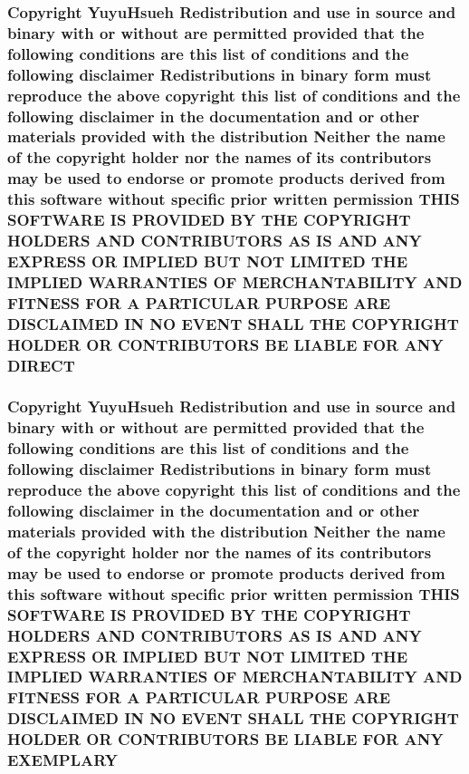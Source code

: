 \subsubsection[{\texorpdfstring{D\+I\+R\+E\+CT}{DIRECT}}]{\setlength{\rightskip}{0pt plus 5cm}Copyright Yuyu\+Hsueh Redistribution and use in source and binary with or without are permitted provided that the following conditions are this list of conditions and the following disclaimer Redistributions in binary form must reproduce the above copyright this list of conditions and the following disclaimer in the documentation and or other materials provided with the distribution Neither the name of the copyright holder nor the names of its contributors may be used to endorse or promote products derived from this software without specific prior written permission T\+H\+IS S\+O\+F\+T\+W\+A\+RE IS P\+R\+O\+V\+I\+D\+ED BY T\+HE C\+O\+P\+Y\+R\+I\+G\+HT H\+O\+L\+D\+E\+RS A\+ND C\+O\+N\+T\+R\+I\+B\+U\+T\+O\+RS AS IS A\+ND A\+NY E\+X\+P\+R\+E\+SS OR I\+M\+P\+L\+I\+ED B\+UT N\+OT L\+I\+M\+I\+T\+ED T\+HE I\+M\+P\+L\+I\+ED {\bf W\+A\+R\+R\+A\+N\+T\+I\+ES} OF M\+E\+R\+C\+H\+A\+N\+T\+A\+B\+I\+L\+I\+TY A\+ND F\+I\+T\+N\+E\+SS F\+OR A P\+A\+R\+T\+I\+C\+U\+L\+AR P\+U\+R\+P\+O\+SE A\+RE D\+I\+S\+C\+L\+A\+I\+M\+ED IN NO E\+V\+E\+NT S\+H\+A\+LL T\+HE C\+O\+P\+Y\+R\+I\+G\+HT H\+O\+L\+D\+ER OR C\+O\+N\+T\+R\+I\+B\+U\+T\+O\+RS BE L\+I\+A\+B\+LE F\+OR A\+NY D\+I\+R\+E\+CT}\hypertarget{license_8txt_a9ecfdaf89f3cf85421feb43ef16f372d}{}\label{license_8txt_a9ecfdaf89f3cf85421feb43ef16f372d}
\subsubsection[{\texorpdfstring{E\+X\+E\+M\+P\+L\+A\+RY}{EXEMPLARY}}]{\setlength{\rightskip}{0pt plus 5cm}Copyright Yuyu\+Hsueh Redistribution and use in source and binary with or without are permitted provided that the following conditions are this list of conditions and the following disclaimer Redistributions in binary form must reproduce the above copyright this list of conditions and the following disclaimer in the documentation and or other materials provided with the distribution Neither the name of the copyright holder nor the names of its contributors may be used to endorse or promote products derived from this software without specific prior written permission T\+H\+IS S\+O\+F\+T\+W\+A\+RE IS P\+R\+O\+V\+I\+D\+ED BY T\+HE C\+O\+P\+Y\+R\+I\+G\+HT H\+O\+L\+D\+E\+RS A\+ND C\+O\+N\+T\+R\+I\+B\+U\+T\+O\+RS AS IS A\+ND A\+NY E\+X\+P\+R\+E\+SS OR I\+M\+P\+L\+I\+ED B\+UT N\+OT L\+I\+M\+I\+T\+ED T\+HE I\+M\+P\+L\+I\+ED {\bf W\+A\+R\+R\+A\+N\+T\+I\+ES} OF M\+E\+R\+C\+H\+A\+N\+T\+A\+B\+I\+L\+I\+TY A\+ND F\+I\+T\+N\+E\+SS F\+OR A P\+A\+R\+T\+I\+C\+U\+L\+AR P\+U\+R\+P\+O\+SE A\+RE D\+I\+S\+C\+L\+A\+I\+M\+ED IN NO E\+V\+E\+NT S\+H\+A\+LL T\+HE C\+O\+P\+Y\+R\+I\+G\+HT H\+O\+L\+D\+ER OR C\+O\+N\+T\+R\+I\+B\+U\+T\+O\+RS BE L\+I\+A\+B\+LE F\+OR A\+NY E\+X\+E\+M\+P\+L\+A\+RY}\hypertarget{license_8txt_ac4a6acd1ced6bfbf36f00e4629d74515}{}\label{license_8txt_ac4a6acd1ced6bfbf36f00e4629d74515}

